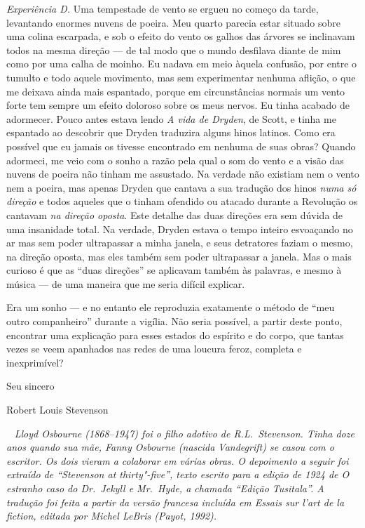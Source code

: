 \textit{Experiência D.}  Uma tempestade de vento se ergueu no começo da
tarde, levantando enormes nuvens de poeira. Meu quarto parecia estar
situado sobre uma colina escarpada, e sob o efeito do vento os galhos
das árvores se inclinavam todos na mesma direção --- de tal modo que o
mundo desfilava diante de mim como por uma calha de moinho.  Eu nadava
em meio àquela confusão, por entre o tumulto e todo aquele
movimento, mas sem experimentar nenhuma aflição, o que me deixava ainda
mais espantado, porque em circunstâncias normais um vento forte tem
sempre um efeito doloroso sobre os meus nervos.  Eu tinha acabado de
adormecer.  Pouco antes estava lendo \textit{A vida de Dryden}, de
Scott, e tinha me espantado ao descobrir que Dryden traduzira alguns
hinos latinos.  Como era possível que eu jamais os tivesse encontrado
em nenhuma de suas obras?  Quando adormeci, me veio com o sonho a razão
pela qual o som do vento e a visão das nuvens de poeira não tinham me
assustado. Na verdade não existiam nem o vento nem a poeira, mas apenas
Dryden que cantava a sua tradução dos hinos \textit{numa só direção} e
todos aqueles que o tinham ofendido ou atacado durante a Revolução os
cantavam \textit{na direção oposta}.  Este detalhe das duas direções		\EP[-1]
era sem dúvida de uma insanidade total.  Na verdade, Dryden estava o
tempo inteiro esvoaçando no ar mas sem poder ultrapassar a minha
janela, e seus detratores faziam o mesmo, na direção oposta, mas eles
também sem poder ultrapassar a janela.  Mas o mais curioso é que as
“duas direções” se aplicavam também às palavras, e mesmo à música --- de
uma maneira que me seria difícil explicar.

Era um sonho --- e no entanto ele reproduzia exatamente o método de “meu
outro companheiro” durante a vigília.  Não seria possível, a partir
deste ponto, encontrar uma explicação para esses estados do espírito e
do corpo, que tantas vezes se veem apanhados nas redes de uma loucura
feroz, completa e inexprimível? 

\bigskip

Seu sincero

Robert Louis Stevenson

\pagebreak
\thispagestyle{empty}
\clearpage
\ifodd\thepage ~ \clearpage\else\relax\fi
\thispagestyle{empty}
\mbox{}\vfill
{\noindent\itshape Lloyd Osbourne (1868--1947) foi o filho
adotivo de R.L.~Stevenson.  Tinha doze anos quando sua mãe, Fanny
Osbourne (nascida Vandegrift) se casou com o escritor.  Os dois vieram
a colaborar em várias obras. O depoimento a seguir foi extraído de
“Stevenson at thirty"-five”, texto escrito para a edição de 1924 de
\emph{O estranho caso do Dr.~Jekyll e Mr.~Hyde}, a chamada “Edição Tusitala”. A tradução foi feita a
partir da versão francesa incluída em \emph{Essais sur l’art de la fiction},
editada por Michel LeBris (Payot, 1992).}

